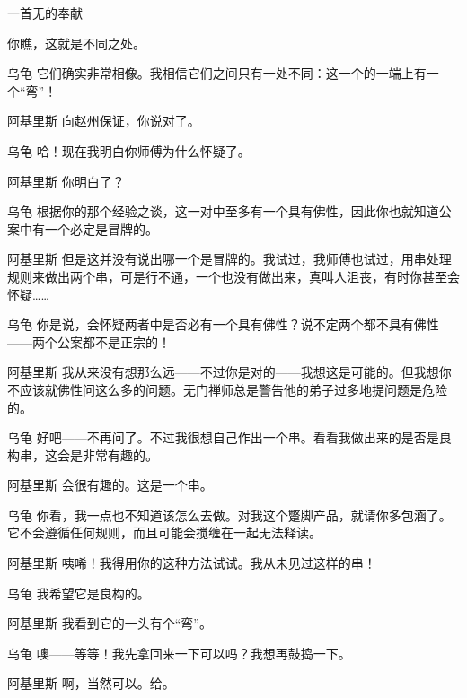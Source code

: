 \begin{dialog}{一首无的奉献\label{abcd}}
\begin{dialogue}
你瞧，这就是不同之处。

\item[乌龟]它们确实非常相像。我相信它们之间只有一处不同：这一个的一端上有一个“弯”！

\item[阿基里斯]向赵州保证，你说对了。

\item[乌龟]哈！现在我明白你师傅为什么怀疑了。

\item[阿基里斯]你明白了？

\item[乌龟]根据你的那个经验之谈，这一对中至多有一个具有佛性，因此你也就知道公案中有一个必定是冒牌的。

\item[阿基里斯]但是这并没有说出哪一个是冒牌的。我试过，我师傅也试过，用串处理规则来做出两个串，可是行不通，一个也没有做出来，真叫人沮丧，有时你甚至会怀疑……

\item[乌龟]你是说，会怀疑两者中是否必有一个具有佛性？说不定两个都不具有佛性——两个公案都不是正宗的！

\item[阿基里斯]我从来没有想那么远——不过你是对的——我想这是可能的。但我想你不应该就佛性问这么多的问题。无门禅师总是警告他的弟子过多地提问题是危险的。

\item[乌龟]好吧——不再问了。不过我很想自己作出一个串。看看我做出来的是否是良构串，这会是非常有趣的。

\item[阿基里斯]会很有趣的。这是一个串。

\item[乌龟]你看，我一点也不知道该怎么去做。对我这个蹩脚产品，就请你多包涵了。它不会遵循任何规则，而且可能会搅缠在一起无法释读。

\item[阿基里斯]咦唏！我得用你的这种方法试试。我从未见过这样的串！

\item[乌龟]我希望它是良构的。

\item[阿基里斯]我看到它的一头有个“弯”。

\item[乌龟]噢——等等！我先拿回来一下可以吗？我想再鼓捣一下。

\item[阿基里斯]啊，当然可以。给。


\end{dialogue}
\end{dialog}
